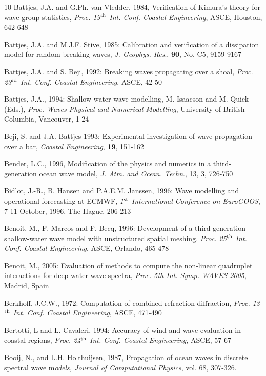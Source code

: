 \documentclass[12pt]{book}
\begin{document}
\begin{thebibliography}{10}
Battjes, J.A. and G.Ph. van Vledder, 1984, Verification of Kimura's theory for wave group statistics, {\it Proc.
19$^{{\rm th}}$ Int. Conf. Coastal Engineering}, ASCE, Houston, 642-648

Battjes, J.A. and M.J.F. Stive, 1985: Calibration and verification of a dissipation model for random breaking
waves, {\it J. Geophys. Res}., {\bf 90}, No. C5, 9159-9167

Battjes, J.A. and S. Beji, 1992: Breaking waves propagating over a shoal, {\it Proc. 23$^{{\rm rd}}$ Int. Conf. Coastal
Engineering}, ASCE, 42-50

Battjes, J.A., 1994: Shallow water wave modelling, M. Isaacson and M. Quick (Eds.), {\it Proc. Waves-Physical
and Numerical Modelling}, University of British Columbia, Vancouver, 1-24

Beji, S. and J.A. Battjes 1993: Experimental investigation of wave propagation over a bar, {\it Coastal
Engineering}, {\bf 19}, 151-162

Bender, L.C., 1996, Modification of the physics and numerics in a third-generation ocean wave model, {\it J.
Atm. and Ocean. Techn}., 13, 3, 726-750

Bidlot, J.-R., B. Hansen and P.A.E.M. Janssen, 1996: Wave modelling and operational forecasting at
ECMWF, {\it 1$^{{\rm st}}$ International Conference on EuroGOOS}, 7-11 October, 1996, The Hague, 206-213

Benoit, M., F. Marcos and F. Becq, 1996: Development of a third-generation shallow-water wave model
with unstructured spatial meshing. {\it Proc. 25$^{{\rm th}}$ Int. Conf. Coastal Engineering}, ASCE, Orlando,
465-478

Benoit, M., 2005: Evaluation of methods to compute the non-linear quadruplet interactions for deep-water wave spectra,
{\it Proc. 5th Int. Symp. WAVES 2005}, Madrid, Spain

Berkhoff, J.C.W., 1972: Computation of combined refraction-diffraction, {\it Proc. 13$^{{\rm th}}$ Int. Conf. Coastal
Engineering}, ASCE, 471-490

Bertotti, L and L. Cavaleri, 1994: Accuracy of wind and wave evaluation in coastal regions, {\it Proc. 24$^{{\rm th}}$ Int.
Conf. Coastal Engineering}, ASCE, 57-67

Booij, N., and L.H. Holthuijsen, 1987, Propagation of ocean waves in discrete spectral wave m{\it odels,
Journal of Computational Physics}, vol. 68, 307-326.


\end{thebibliography}
\end{document}
